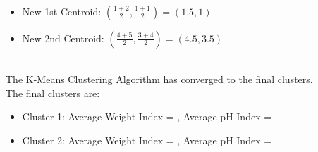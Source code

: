 \documentclass{book}
\begin{document}
\\
\begin{itemize}
    \item New 1st Centroid: \((\frac{1+2}{2}, \frac{1+1}{2}) = (1.5, 1)\)
    \item New 2nd Centroid: \((\frac{4+5}{2}, \frac{3+4}{2}) = (4.5, 3.5)\)
\end{itemize}
\\
The K-Means Clustering Algorithm has converged to the final clusters.\\
The final clusters are:
\begin{itemize}
    \item Cluster 1: Average Weight Index = , Average pH Index = 
    \item Cluster 2: Average Weight Index = , Average pH Index = 
\end{itemize}
\end{document}
